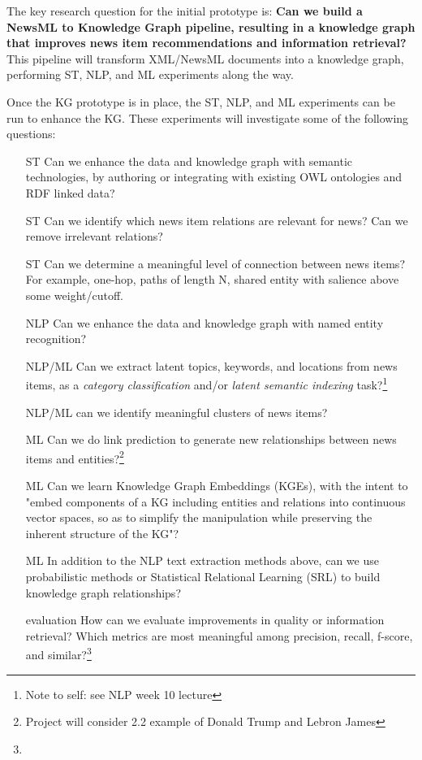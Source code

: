 \documentclass[11pt]{article}   	%
\begin{document}
The key research question for the initial prototype is: \textbf{Can we build a NewsML to Knowledge Graph pipeline, resulting in a knowledge graph that improves news item recommendations and information retrieval?} This pipeline will transform XML/NewsML documents into a knowledge graph, performing ST, NLP, and ML experiments along the way.

Once the KG prototype is in place, the ST, NLP, and ML experiments can be run to enhance the KG. These experiments will investigate some of the following questions:
\begin{itemize}
\item [ST] Can we enhance the data and knowledge graph with semantic technologies, by authoring or integrating with existing OWL ontologies and RDF linked data?
\item [ST] Can we identify which news item relations are relevant for news? Can we remove irrelevant relations?
\item [ST] Can we determine a meaningful level of connection between news items? For example, one-hop, paths of length N, shared entity with salience above some weight/cutoff.
\item [NLP] Can we enhance the data and knowledge graph with named entity recognition?
\item [NLP/ML] Can we extract latent topics, keywords, and locations from news items, as a \textit{category classification} and/or \textit{latent semantic indexing} task?\footnote{Note to self: see NLP week 10 lecture}
\item [NLP/ML] can we identify meaningful clusters of news items?
\item [ML] Can we do link prediction to generate new relationships between news items and entities?\footnote{Project will consider 2.2 example of Donald Trump and Lebron James\cite{liu2019news}}
\item [ML] Can we learn Knowledge Graph Embeddings (KGEs), with the intent to "embed components of a KG including entities and relations into continuous vector spaces, so as to simplify the manipulation while preserving the inherent structure of the KG"?\cite{wang2017knowledge}
\item [ML] In addition to the NLP text extraction methods above, can we use probabilistic methods\cite{45634} or Statistical Relational Learning (SRL)\cite{nickel2015review} to build knowledge graph relationships?
\item [evaluation] How can we evaluate improvements in quality or information retrieval? Which metrics are most meaningful among precision, recall, f-score, and similar?\footnote{
}
\end{itemize}
\end{document}
